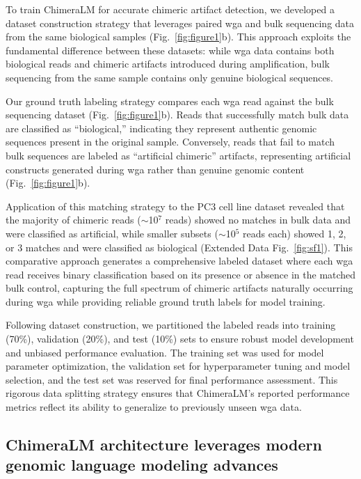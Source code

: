 \documentclass[pdflatex,sn-nature]{sn-jnl}%
\theoremstyle{thmstyleone}%
\theoremstyle{thmstyletwo}%
\theoremstyle{thmstylethree}%
\begin{document}
To train ChimeraLM for accurate chimeric artifact detection, we developed a dataset construction strategy that leverages paired \gls{wga} and bulk sequencing data from the same biological samples (Fig.~\ref{fig:figure1}b).
This approach exploits the fundamental difference between these datasets: while \gls{wga} data contains both biological reads and chimeric artifacts introduced during amplification, bulk sequencing from the same sample contains only genuine biological sequences.

Our ground truth labeling strategy compares each \gls{wga} read against the bulk sequencing dataset (Fig.~\ref{fig:figure1}b).
Reads that successfully match bulk data are classified as ``biological,'' indicating they represent authentic genomic sequences present in the original sample.
Conversely, reads that fail to match bulk sequences are labeled as ``artificial chimeric'' artifacts, representing artificial constructs generated during \gls{wga} rather than genuine genomic content (Fig.~\ref{fig:figure1}b).

Application of this matching strategy to the PC3 cell line dataset revealed that the majority of chimeric reads ($\sim$10$^7$ reads) showed no matches in bulk data and were classified as artificial, while smaller subsets ($\sim$10$^5$ reads each) showed 1, 2, or 3 matches and were classified as biological (Extended Data Fig.~\ref{fig:sf1}).
This comparative approach generates a comprehensive labeled dataset where each \gls{wga} read receives binary classification based on its presence or absence in the matched bulk control, capturing the full spectrum of chimeric artifacts naturally occurring during \gls{wga} while providing reliable ground truth labels for model training.

Following dataset construction, we partitioned the labeled reads into training (70\%), validation (20\%), and test (10\%) sets to ensure robust model development and unbiased performance evaluation.
The training set was used for model parameter optimization, the validation set for hyperparameter tuning and model selection, and the test set was reserved for final performance assessment.
This rigorous data splitting strategy ensures that ChimeraLM's reported performance metrics reflect its ability to generalize to previously unseen \gls{wga} data.

\subsection*{ChimeraLM architecture leverages modern genomic language modeling advances}
\end{document}
